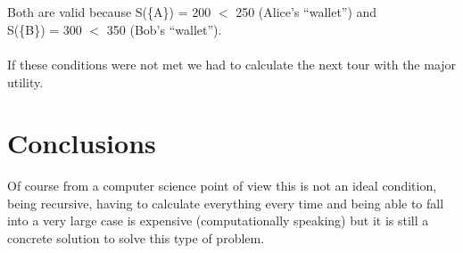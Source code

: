 \documentclass{article}
\begin{document}
\\\\Both are valid because S(\{A\}) = 200 $<$ 250 (Alice's “wallet”) and \\S(\{B\}) = 300 $<$ 350 (Bob's “wallet”). \\\\If these conditions were not met we had to calculate the next tour with the major utility.

\section{Conclusions}
\Large{
Of course from a computer science point of view this is not an ideal
condition, being recursive, having to calculate everything every time and being able to fall into a very large case is expensive (computationally speaking) but it is still a concrete solution to solve this type of problem.
}
\end{document}
